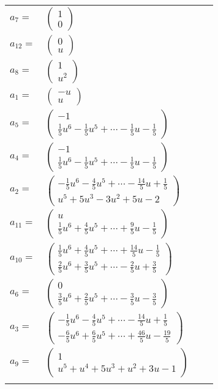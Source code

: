 \documentclass[1p]{elsarticle_modified}
\theoremstyle{definition}
\begin{document}
\begin{tabular}{m{7pt} m{180pt} m{7pt} m{180pt} }
\flushright $a_{7}=$&$\begin{pmatrix}1\\0\end{pmatrix}$ \\
\flushright $a_{12}=$&$\begin{pmatrix}0\\u\end{pmatrix}$ \\
\flushright $a_{8}=$&$\begin{pmatrix}1\\u^2\end{pmatrix}$ \\
\flushright $a_{1}=$&$\begin{pmatrix}- u\\u\end{pmatrix}$ \\
\flushright $a_{5}=$&$\begin{pmatrix}-1\\\frac{1}{5} u^6-\frac{1}{5} u^5+\cdots-\frac{1}{5} u-\frac{1}{5}\end{pmatrix}$ \\
\flushright $a_{4}=$&$\begin{pmatrix}-1\\\frac{1}{5} u^6-\frac{1}{5} u^5+\cdots-\frac{1}{5} u-\frac{1}{5}\end{pmatrix}$ \\
\flushright $a_{2}=$&$\begin{pmatrix}-\frac{1}{5} u^6-\frac{4}{5} u^5+\cdots-\frac{14}{5} u+\frac{1}{5}\\u^5+5 u^3-3 u^2+5 u-2\end{pmatrix}$ \\
\flushright $a_{11}=$&$\begin{pmatrix}u\\\frac{1}{5} u^6+\frac{4}{5} u^5+\cdots+\frac{9}{5} u-\frac{1}{5}\end{pmatrix}$ \\
\flushright $a_{10}=$&$\begin{pmatrix}\frac{1}{5} u^6+\frac{4}{5} u^5+\cdots+\frac{14}{5} u-\frac{1}{5}\\\frac{2}{5} u^6+\frac{3}{5} u^5+\cdots-\frac{2}{5} u+\frac{3}{5}\end{pmatrix}$ \\
\flushright $a_{6}=$&$\begin{pmatrix}0\\\frac{3}{5} u^6+\frac{2}{5} u^5+\cdots-\frac{3}{5} u-\frac{3}{5}\end{pmatrix}$ \\
\flushright $a_{3}=$&$\begin{pmatrix}-\frac{1}{5} u^6-\frac{4}{5} u^5+\cdots-\frac{14}{5} u+\frac{1}{5}\\-\frac{6}{5} u^6+\frac{6}{5} u^5+\cdots+\frac{46}{5} u-\frac{19}{5}\end{pmatrix}$ \\
\flushright $a_{9}=$&$\begin{pmatrix}1\\u^5+u^4+5 u^3+u^2+3 u-1\end{pmatrix}$\\&\end{tabular}
\end{document}
